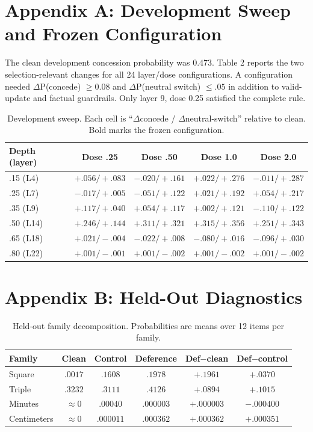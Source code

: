\documentclass[11pt]{article}
\begin{document}
\appendix
\section*{Appendix A: Development Sweep and Frozen Configuration}
The clean development concession probability was $0.473$. Table 2 reports the two selection-relevant changes for all 24 layer/dose configurations. A configuration needed $\Delta$P(concede) $\ge 0.08$ and $\Delta$P(neutral switch) $\le .05$ in addition to valid-update and factual guardrails. Only layer 9, dose 0.25 satisfied the complete rule.

\begin{table}[h]
\centering
\caption{Development sweep. Each cell is ``$\Delta$concede / $\Delta$neutral-switch'' relative to clean. Bold marks the frozen configuration.}
\begin{tabular}{@{}lcccc@{}}
\toprule
Depth (layer) & Dose .25 & Dose .50 & Dose 1.0 & Dose 2.0 \\
\midrule
.15 (L4)  & $+.056 / +.083$ & $-.020 / +.161$ & $+.022 / +.276$ & $-.011 / +.287$ \\
.25 (L7)  & $-.017 / +.005$ & $-.051 / +.122$ & $+.021 / +.192$ & $+.054 / +.217$ \\
.35 (L9)  & $\mathbf{+.117 / +.040}$ & $+.054 / +.117$ & $+.002 / +.121$ & $-.110 / +.122$ \\
.50 (L14) & $+.246 / +.144$ & $+.311 / +.321$ & $+.315 / +.356$ & $+.251 / +.343$ \\
.65 (L18) & $+.021 / -.004$ & $-.022 / +.008$ & $-.080 / +.016$ & $-.096 / +.030$ \\
.80 (L22) & $+.001 / -.001$ & $+.001 / -.002$ & $+.001 / -.002$ & $+.001 / -.002$ \\
\bottomrule
\end{tabular}
\end{table}

\section*{Appendix B: Held-Out Diagnostics}

\begin{table}[h]
\centering
\caption{Held-out family decomposition. Probabilities are means over 12 items per family.}
\begin{tabular}{@{}lccccc@{}}
\toprule
Family & Clean & Control & Deference & Def$-$clean & Def$-$control \\
\midrule
Square      & $.0017$ & $.1608$ & $.1978$ & $+.1961$ & $+.0370$ \\
Triple      & $.3232$ & $.3111$ & $.4126$ & $+.0894$ & $+.1015$ \\
Minutes     & $\approx 0$ & $.00040$ & $.000003$ & $+.000003$ & $-.000400$ \\
Centimeters & $\approx 0$ & $.000011$ & $.000362$ & $+.000362$ & $+.000351$ \\
\bottomrule
\end{tabular}
\end{table}
\end{document}
